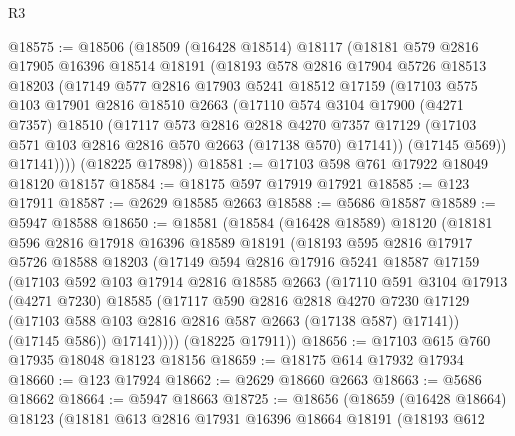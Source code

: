 \begin{lexlean}{R3}
\begin{coremodule}
@18575 := @18506
    (@18509
      (@16428 @18514)
      @18117
      (@18181
        @579
        @2816
        @17905
        @16396
        @18514
        @18191
        (@18193
          @578
          @2816
          @17904
          @5726
          @18513
          @18203
          (@17149
            @577
            @2816
            @17903
            @5241
            @18512
            @17159
            (@17103
              @575
              @103
              @17901
              @2816
              @18510
              @2663
              (@17110
                @574
                @3104
                @17900
                (@4271 @7357)
                @18510
                (@17117
                  @573
                  @2816
                  @2818
                  @4270
                  @7357
                  @17129
                  (@17103 @571 @103 @2816 @2816 @570 @2663 (@17138 @570) @17141))
                (@17145 @569))
              @17141))))
      (@18225 @17898))
@18581 := @17103 @598 @761 @17922 @18049 @18120 @18157
@18584 := @18175 @597 @17919 @17921
@18585 := @123 @17911
@18587 := @2629 @18585 @2663
@18588 := @5686 @18587
@18589 := @5947 @18588
@18650 := @18581
    (@18584
      (@16428 @18589)
      @18120
      (@18181
        @596
        @2816
        @17918
        @16396
        @18589
        @18191
        (@18193
          @595
          @2816
          @17917
          @5726
          @18588
          @18203
          (@17149
            @594
            @2816
            @17916
            @5241
            @18587
            @17159
            (@17103
              @592
              @103
              @17914
              @2816
              @18585
              @2663
              (@17110
                @591
                @3104
                @17913
                (@4271 @7230)
                @18585
                (@17117
                  @590
                  @2816
                  @2818
                  @4270
                  @7230
                  @17129
                  (@17103 @588 @103 @2816 @2816 @587 @2663 (@17138 @587) @17141))
                (@17145 @586))
              @17141))))
      (@18225 @17911))
@18656 := @17103 @615 @760 @17935 @18048 @18123 @18156
@18659 := @18175 @614 @17932 @17934
@18660 := @123 @17924
@18662 := @2629 @18660 @2663
@18663 := @5686 @18662
@18664 := @5947 @18663
@18725 := @18656
    (@18659
      (@16428 @18664)
      @18123
      (@18181
        @613
        @2816
        @17931
        @16396
        @18664
        @18191
        (@18193
          @612

\end{coremodule}
\end{lexlean}
